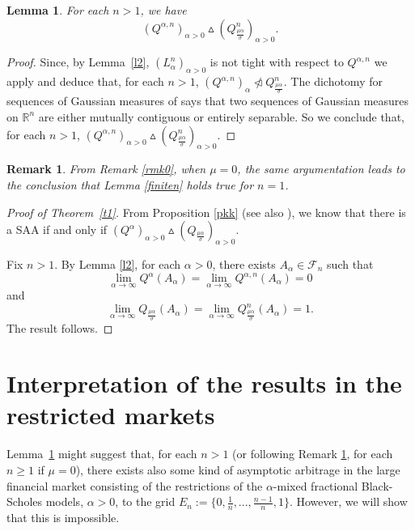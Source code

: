 \documentclass[reqno,a4paper]{amsart}
\theoremstyle{plain}
\theoremstyle{definition}
\theoremstyle{plain}
\newtheorem{lemma}{Lemma}
\theoremstyle{plain}
\newtheorem{remark}{Remark}
\theoremstyle{plain}
\begin{document}
\begin{lemma}\label{finiten}
For each $n>1$, we have $$(Q^{\alpha,n})_{\alpha>0}\vartriangle \left(Q_{\frac{\mu\alpha}{\sigma}}^n\right)_{\alpha>0}.$$
\end{lemma}
\begin{proof}
 Since, by Lemma~\ref{l2},  $(L_\alpha^n)_{\alpha>0}$ is not tight with respect to $Q^{\alpha,n}$ we apply \cite[Lemma V.1.6]{Jashi} and deduce that, for each $n> 1$, $(Q^{\alpha,n})_{\alpha}\ntriangleleft Q_{\frac{\mu\alpha}{\sigma}}^n$. The dichotomy for sequences of  Gaussian measures  of \cite[Corollary 4]{Eag81}
 says that two sequences of Gaussian measures on $\mathbb{R}^n$ are either mutually contiguous or entirely separable.
 So we conclude that, for each $n> 1$, $(Q^{\alpha,n})_{\alpha>0}\vartriangle (Q_{\frac{\mu\alpha}{\sigma}}^n)_{\alpha>0}$.
\end{proof}
\begin{remark}\label{final}
From Remark \ref{rmk0}, when $\mu=0$, the same argumentation leads to the conclusion that Lemma \eqref{finiten} holds true for $n=1$.
\end{remark}
\begin{proof}[Proof of Theorem~\ref{t1}]
From  Proposition \ref{pkk} (see also \cite[Proposition 4]{Kakra}), we know that there is a SAA if and only if $(Q^{\alpha})_{\alpha>0}\vartriangle (Q_{\frac{\mu\alpha}{\sigma}})_{\alpha>0}$.

Fix $n>1$. By Lemma \ref{l2}, for each $\alpha>0$, there exists $A_\alpha\in{{\mathcal F}}_n$ such that $$\lim_{\alpha\to\infty} Q^{\alpha}(A_\alpha)=\lim_{\alpha\to\infty}Q^{\alpha,n}(A_\alpha)=0$$ and $$\lim_{\alpha\to\infty} Q_{\frac{\mu\alpha}{\sigma}}(A_\alpha)=\lim_{\alpha\to\infty}Q_{\frac{\mu\alpha}{\sigma}}^n(A_\alpha)=1.$$ The result follows.
\end{proof}

\section{Interpretation of the results in the restricted markets}\label{S3}
 Lemma~\ref{finiten} might suggest that, for each $n>1$ (or following Remark \ref{final}, for each $n\geq1$ if $\mu=0$), there exists also some kind of asymptotic arbitrage in the large financial market consisting of the restrictions of the $\alpha$-mixed fractional Black-Scholes models, $\alpha>0$, to the grid $E_n:=\{0,\frac{1}{n},...,\frac{n-1}{n},1\}$. However, we will show that this is impossible. 
 
\end{document}
